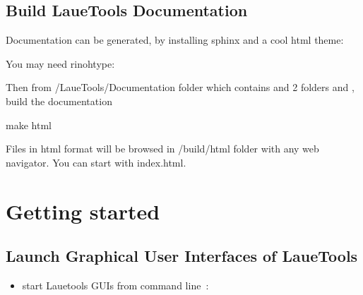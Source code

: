 \documentclass[letterpaper,10pt,english]{sphinxmanual}
\begin{document}
\section{Build LaueTools Documentation}
\label{\detokenize{installation:build-lauetools-documentation}}
Documentation can be generated, by installing sphinx and a cool html theme:

%
\begin{sphinxVerbatim}[commandchars=\\\{\}]
  

  
\end{sphinxVerbatim}

You may need rinohtype:

%
\begin{sphinxVerbatim}[commandchars=\\\{\}]
  
\end{sphinxVerbatim}

Then from /LaueTools/Documentation folder which contains  and 2 folders  and , build the documentation

%
\begin{sphinxVerbatim}[commandchars=\\\{\}]
make html
\end{sphinxVerbatim}

Files in html format will be browsed in /build/html folder with any web navigator. You can start with index.html.


\chapter{Getting started}
\label{\detokenize{getStarted::doc}}\label{\detokenize{getStarted:getting-started}}

\section{Launch Graphical User Interfaces of LaueTools}
\label{\detokenize{getStarted:launch-graphical-user-interfaces-of-lauetools}}\begin{itemize}
\item {} 
start Lauetools GUIs from command line :

\end{itemize}
\end{document}
